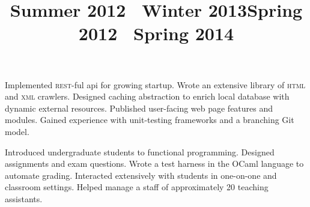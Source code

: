 \begin{resume}
\title{Summer 2012 \textendash\ Winter 2013}
\location{}
\begin{position}
Implemented \textsc{rest-}ful api for growing startup.
Wrote an extensive library of \textsc{html} and \textsc{xml} crawlers.
Designed caching abstraction to enrich local database with dynamic external resources.
Published user-facing web page features and modules.
Gained experience with unit-testing frameworks and a branching Git model.
\end{position}

\title{Spring 2012 \textendash\ Spring 2014}
\location{}
\begin{position}
Introduced undergraduate students to functional programming.
Designed assignments and exam questions. 
Wrote a test harness in the OCaml language to automate grading.
Interacted extensively with students in one-on-one and classroom settings.
Helped manage a staff of approximately 20 teaching assistants.
\end{position}





\end{resume}
